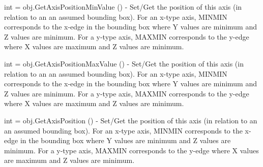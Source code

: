 \begin{DoxyItemize}
\item {\ttfamily int = obj.\-Get\-Axis\-Position\-Min\-Value ()} -\/ Set/\-Get the position of this axis (in relation to an an assumed bounding box). For an x-\/type axis, M\-I\-N\-M\-I\-N corresponds to the x-\/edge in the bounding box where Y values are minimum and Z values are minimum. For a y-\/type axis, M\-A\-X\-M\-I\-N corresponds to the y-\/edge where X values are maximum and Z values are minimum.


\item {\ttfamily int = obj.\-Get\-Axis\-Position\-Max\-Value ()} -\/ Set/\-Get the position of this axis (in relation to an an assumed bounding box). For an x-\/type axis, M\-I\-N\-M\-I\-N corresponds to the x-\/edge in the bounding box where Y values are minimum and Z values are minimum. For a y-\/type axis, M\-A\-X\-M\-I\-N corresponds to the y-\/edge where X values are maximum and Z values are minimum.


\item {\ttfamily int = obj.\-Get\-Axis\-Position ()} -\/ Set/\-Get the position of this axis (in relation to an an assumed bounding box). For an x-\/type axis, M\-I\-N\-M\-I\-N corresponds to the x-\/edge in the bounding box where Y values are minimum and Z values are minimum. For a y-\/type axis, M\-A\-X\-M\-I\-N corresponds to the y-\/edge where X values are maximum and Z values are minimum.



\end{DoxyItemize}
